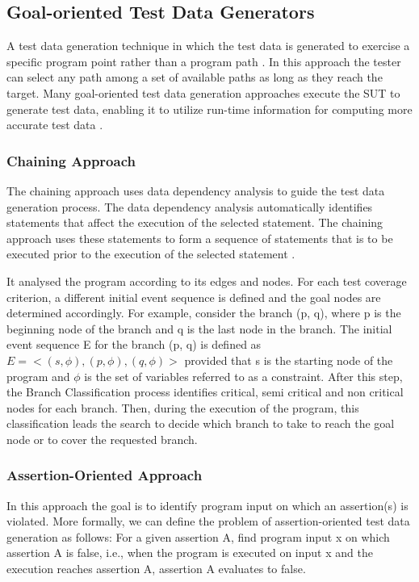 

\subsection{Goal-oriented Test Data Generators}
A test data generation technique in which the test data is generated to exercise a specific program point rather than a program path \cite{chungautomated}.  In this approach the tester can select any path among a set of available paths as long as they reach the target. Many goal-oriented test data generation approaches execute the SUT to generate test data, enabling it to utilize run-time information for computing more accurate test data \cite{ferguson1996chaining}.

\subsubsection{Chaining Approach}
The chaining approach uses data dependency analysis to guide the test data generation process. The data dependency analysis automatically identifies statements that affect the execution of the selected statement. The chaining approach uses these statements to form a sequence of statements that is to be executed prior to the execution of the selected statement \cite{ferguson1996chaining}.

It analysed the program according to its edges and nodes. For each test coverage criterion, a different initial event sequence is defined and the goal nodes are determined accordingly. For example, consider  the branch (p, q), where p is  the beginning node of the branch and q is the last node in the branch. The initial event sequence E for the branch (p, q) is defined as $E =< (s,\phi), (p,\phi),(q,\phi) >$ provided that s is the starting node of the program and $\phi$ is the set of variables referred to as a constraint. After this step, the Branch Classification process identifies critical, semi critical and non critical nodes for each branch. Then, during the execution of the program, this classification leads the search to decide which branch to take to reach the goal node or to cover the requested branch.  


\subsubsection{Assertion-Oriented Approach}
In this approach the goal is to identify program input on which an assertion(s) is violated. More formally, we can define the problem of assertion-oriented test data generation as follows: For a given assertion A, find program input x on which assertion A is false, i.e., when the program is executed on input x and the execution reaches assertion A, assertion A evaluates to false.

